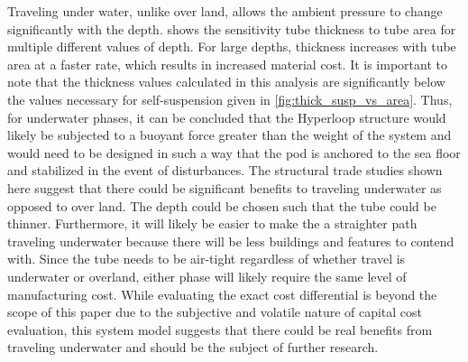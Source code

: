 Traveling under water, unlike over land, allows the ambient pressure to change significantly with the depth.  shows the sensitivity tube thickness to tube area for multiple different values of depth. For large depths, thickness increases with tube area at a faster rate, which results in increased material cost. It is important to note that the thickness values calculated in this analysis are significantly below the values necessary for self-suspension given in \cref{fig:thick_susp_vs_area}. Thus, for underwater phases, it can be concluded that the Hyperloop structure would likely be subjected to a buoyant force greater than the weight of the system and would need to be designed in such a way that the pod is anchored to the sea floor and stabilized in the event of disturbances.
The structural trade studies shown here suggest that there could be significant benefits to traveling underwater as opposed to over land. The depth could be chosen such that the tube could be thinner. Furthermore, it will likely be easier to make the a straighter path traveling underwater because there will be less buildings and features to contend with. Since the tube needs to be air-tight regardless of whether travel is underwater or overland, either phase will likely require the same level of manufacturing cost. While evaluating the exact cost differential is beyond the scope of this paper due to the subjective and volatile nature of capital cost evaluation, this system model suggests that there could be real benefits from traveling underwater and should be the subject of further research.
